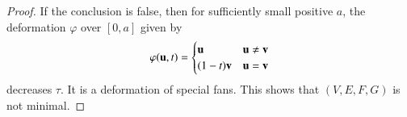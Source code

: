 \begin{proof} If the conclusion is false, then for sufficiently small positive $a$,  the deformation $\varphi$ over $[0,a]$ given by
$$
\varphi({\mathbf u},t) =
\begin{cases}
{\mathbf u} & {\mathbf u} \ne {\mathbf v}\\
(1-t) {\mathbf v} & {\mathbf u} = {\mathbf v}\\
\end{cases}
$$
decreases $\tau$.  It is a deformation of special fans.  This shows that $(V,E,F,G)$ is not minimal.
\end{proof}






%
%


%
%



